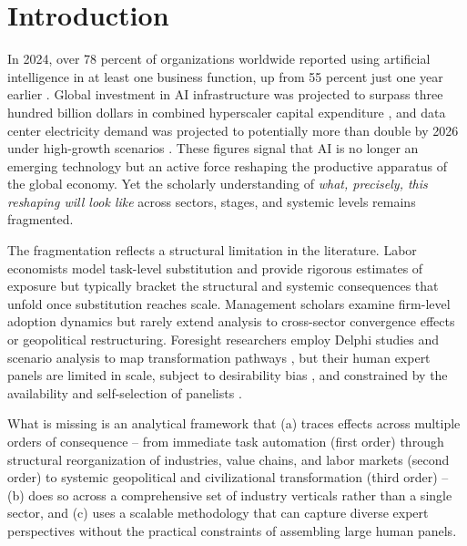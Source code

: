 \documentclass[preprint,review,12pt]{elsarticle}
\begin{document}
\section{Introduction}
\label{sec:introduction}

In 2024, over 78 percent of organizations worldwide reported using artificial intelligence in at least one business function, up from 55 percent just one year earlier \citep{mckinsey2025ai}. Global investment in AI infrastructure was projected to surpass three hundred billion dollars in combined hyperscaler capital expenditure \citep{morganstanley2024capex}, and data center electricity demand was projected to potentially more than double by 2026 under high-growth scenarios \citep{iea2024electricity}. These figures signal that AI is no longer an emerging technology but an active force reshaping the productive apparatus of the global economy. Yet the scholarly understanding of \textit{what, precisely, this reshaping will look like} across sectors, stages, and systemic levels remains fragmented.

The fragmentation reflects a structural limitation in the literature. Labor economists model task-level substitution \citep{acemoglu2018artificial, acemoglu2019automation, acemoglu2022aijobs, eloundou2023gpts, autor2024applying, frank2019toward} and provide rigorous estimates of exposure but typically bracket the structural and systemic consequences that unfold once substitution reaches scale. Management scholars examine firm-level adoption dynamics \citep{raisch2021automation, kanbach2023genai, dwivedi2023chatgpt} but rarely extend analysis to cross-sector convergence effects or geopolitical restructuring. Foresight researchers employ Delphi studies and scenario analysis to map transformation pathways \citep{culot2020manufacturing, fritschy2019autonomous}, but their human expert panels are limited in scale, subject to desirability bias \citep{ecken2011desirability}, and constrained by the availability and self-selection of panelists \citep{foerster2014delphipanel, sokolov2025delphias}.

What is missing is an analytical framework that (a) traces effects across multiple orders of consequence -- from immediate task automation (first order) through structural reorganization of industries, value chains, and labor markets (second order) to systemic geopolitical and civilizational transformation (third order) -- (b) does so across a comprehensive set of industry verticals rather than a single sector, and (c) uses a scalable methodology that can capture diverse expert perspectives without the practical constraints of assembling large human panels.
\end{document}
